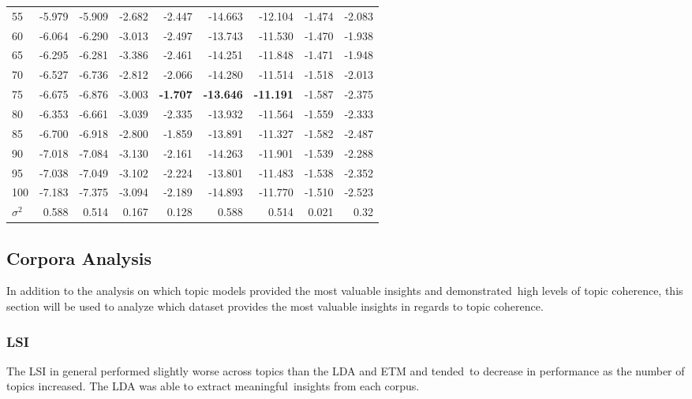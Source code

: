 \documentclass[letterpaper,12pt]{article}
\begin{document}
\begin{table}
\begin{center}
\begin{tabular}{| l |rr|rr|rr|rr|}
			55  & -5.979 & -5.909 & -2.682 & -2.447 & -14.663 & -12.104 & -1.474 & -2.083 \\
			60  & -6.064 & -6.290 & -3.013 & -2.497 & -13.743 & -11.530 & -1.470 & -1.938 \\
			65  & -6.295 & -6.281 & -3.386 & -2.461 & -14.251 & -11.848 & -1.471 & -1.948 \\
			70  & -6.527 & -6.736 & -2.812 & -2.066 & -14.280 & -11.514 & -1.518 & -2.013 \\
			75  & -6.675 & -6.876 & -3.003 & \textbf{-1.707} & \textbf{-13.646} & \textbf{-11.191} & -1.587 & -2.375 \\
			80  & -6.353 & -6.661 & -3.039 & -2.335 & -13.932 & -11.564 & -1.559 & -2.333 \\
			85  & -6.700 & -6.918 & -2.800 & -1.859 & -13.891 & -11.327 & -1.582 & -2.487 \\
			90  & -7.018 & -7.084 & -3.130 & -2.161 & -14.263 & -11.901 & -1.539 & -2.288 \\
			95  & -7.038 & -7.049 & -3.102 & -2.224 & -13.801 & -11.483 & -1.538 & -2.352 \\
			100 & -7.183 & -7.375 & -3.094 & -2.189 & -14.893 & -11.770 & -1.510 & -2.523 \\
			\hline
			$\sigma^2$ & 0.588 & 0.514 & 0.167 & 0.128 & 0.588 & 0.514 & 0.021 & 0.32 \\
			\hline
			\end{tabular}
	\end{center}
\end{table}



\newpage

\subsection{Corpora Analysis}

In addition to the analysis on which topic models provided the most valuable insights and demonstrated\
high levels of topic coherence, this section will be used to analyze which dataset provides the most valuable insights
in regards to topic coherence.

\subsubsection{LSI}
The LSI in general performed slightly worse across topics than the LDA and ETM and tended\
to decrease in performance as the number of topics increased. The LDA was able to extract meaningful\
insights from each corpus. 
\end{document}
